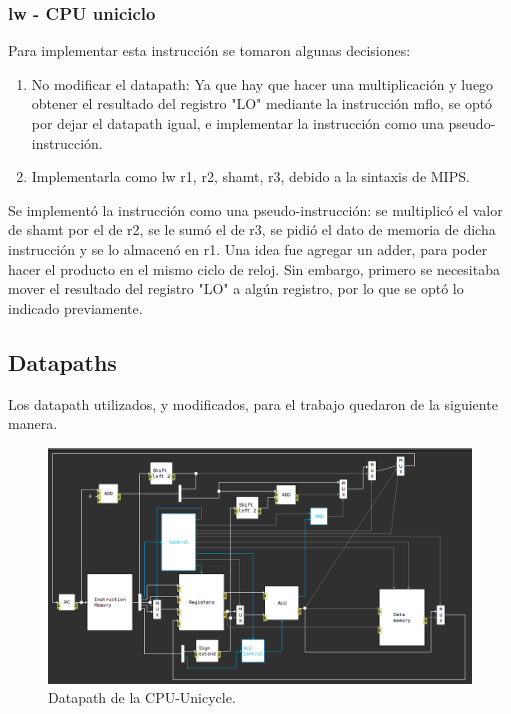 \documentclass[a4paper, 12pt]{article}
\begin{document}
	\subsubsection{lw - CPU uniciclo}
	Para implementar esta instrucción se tomaron algunas decisiones:
	\begin{enumerate}
	\item No modificar el datapath: Ya que hay que hacer una multiplicación y luego obtener el resultado del registro "LO" mediante la instrucción mflo, se optó por dejar el datapath igual, e implementar la instrucción como una pseudo-instrucción.
	\item Implementarla como lw r1, r2, shamt, r3, debido a la sintaxis de MIPS.
	\end{enumerate}
	Se implementó la instrucción como una pseudo-instrucción: se multiplicó el valor de shamt por el de r2, se le sumó el de r3, se pidió el dato de memoria de dicha instrucción y se lo almacenó en r1.
	Una idea fue agregar un adder, para poder hacer el producto en el mismo ciclo de reloj. Sin embargo, primero se necesitaba mover el resultado del registro "LO" a algún registro, por lo que se optó lo indicado previamente.
	
	
	\subsection{Datapaths}
	Los datapath utilizados, y modificados, para el trabajo quedaron de la siguiente manera.
	
		\begin{figure}[h]
	  		\centering
			    \includegraphics[width=\textwidth]{files/cpuunicycle.png}
		 	 \caption{Datapath de la CPU-Unicycle.}
	  		\label{fig}
		\end{figure}
	
\end{document}
